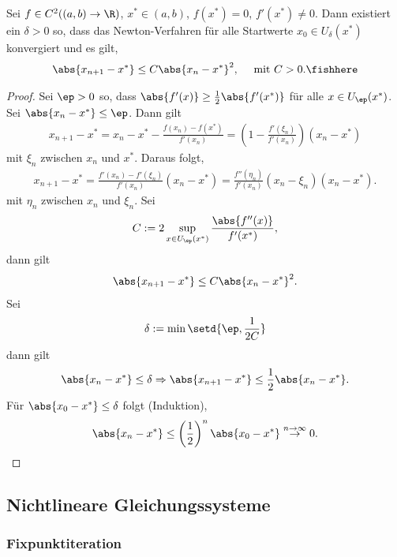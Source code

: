 \begin{prop}
\label{prop:5.2}
Sei $f\in C^2((a,b)\to\R)$, $x^*\in (a,b)$, $f(x^*)=0$, $f'(x^*)\neq 0$. Dann
existiert ein $\delta > 0$ so, dass das Newton-Verfahren für alle
Startwerte $x_0 \in U_\delta(x^*)$ konvergiert und es gilt,
\begin{align*}
\abs{x_{n+1}-x^*}\le C\abs{x_n-x^*}^2, \quad \text{ mit }C>0.\fishhere
\end{align*}
\end{prop}
\begin{proof}
Sei $\ep >0$ so, dass $\abs{f'(x)} \ge \frac{1}{2}\abs{f'(x^*)}$ für alle $x\in
U_\ep(x^*)$. Sei $\abs{x_n-x^*}\le \ep$. Dann gilt
\begin{align*}
x_{n+1}-x^* = x_n - x^* - \frac{f(x_n)-f(x^*)}{f'(x_n)}
= \left(1- \frac{f'(\xi_n)}{f'(x_n)} \right)(x_n-x^*)
\end{align*}
mit $\xi_n$ zwischen $x_n$ und $x^*$. Daraus folgt,
\begin{align*}
x_{n+1}-x^* = \frac{f'(x_n)-f'(\xi_n)}{f'(x_n)}(x_n-x^*)
= \frac{f''(\eta_n)}{f'(x_n)}\left(x_n - \xi_n\right)(x_n-x^*).
\end{align*}
mit $\eta_n$ zwischen $x_n$ und $\xi_n$. Sei
\begin{align*}
C:= 2\sup\limits_{x\in U_\ep(x^*)}\frac{\abs{f''(x)}}{f'(x^*)},
\end{align*}
dann gilt
\begin{align*}
\abs{x_{n+1}-x^*} \le C\abs{x_n-x^*}^2.
\end{align*}
Sei
\begin{align*}
\delta := \min\setd{\ep,\frac{1}{2C}}
\end{align*}
dann gilt
\begin{align*}
\abs{x_n-x^*} \le \delta \Rightarrow \abs{x_{n+1}-x^*} \le
\frac{1}{2}\abs{x_n-x^*}.
\end{align*}
Für $\abs{x_0-x^*} \le \delta$ folgt (Induktion),
\begin{align*}
\abs{x_n-x^*} \le
\left(\frac{1}{2}\right)^n\abs{x_0-x^*}\overset{n\to\infty}{\to}0.\qedhere
\end{align*}
\end{proof}

\subsection{Nichtlineare Gleichungssysteme}

\subsubsection{Fixpunktiteration}

